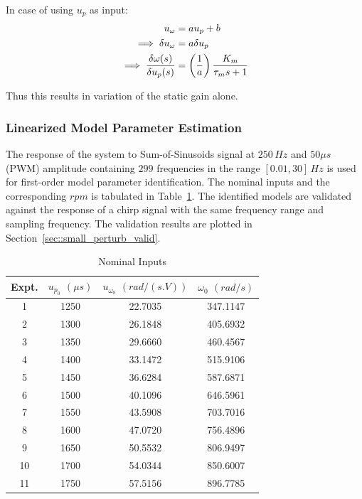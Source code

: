 In case of using $u_p$ as input:
\begin{align*}
    u_\omega &= a u_p + b\\
    \implies \delta u_\omega &= a \delta u_p\\
    \implies \frac{\delta \omega(s)}{\delta u_p(s)} &= \left( \frac{1}{a} \right)\frac{K_m}{\tau_m s + 1}
\end{align*}

Thus this results in variation of the static gain alone.


\subsubsection{Linearized Model Parameter Estimation}
The response of the system to Sum-of-Sinusoids signal at $250 \, Hz$ and $50 \mu s$ (PWM) amplitude containing $299$ frequencies in the range $[0.01, 30]\,Hz$ is used for first-order model parameter identification. The nominal inputs and the corresponding $rpm$ is tabulated in Table~\ref{tab::nom_in}. The identified models are validated against the response of a chirp signal with the same frequency range and sampling frequency. The validation results are plotted in Section~\ref{sec::small_perturb_valid}.

\begin{table}[H]
    \centering
    \begin{tabular}{c c c c}
        \hline \hline
        Expt. & $u_{p_0}$ $(\mu s)$& $u_{\omega_0}$ $(rad/(s.V))$ & $\omega_0$ $(rad/s)$ \\ \hline \hline
            1 & 1250      &  22.7035       &  347.1147   \\
            2 & 1300      &  26.1848       &  405.6932   \\
            3 & 1350      &  29.6660       &  460.4567   \\
            4 & 1400      &  33.1472       &  515.9106   \\
            5 & 1450      &  36.6284       &  587.6871   \\
            6 & 1500      &  40.1096       &  646.5961   \\
            7 & 1550      &  43.5908       &  703.7016   \\
            8 & 1600      &  47.0720       &  756.4896   \\
            9 & 1650      &  50.5532       &  806.9497   \\
           10 & 1700      &  54.0344       &  850.6007   \\
           11 & 1750      &  57.5156       &  896.7785   \\
           \hline \hline
    \end{tabular}
    \caption{Nominal Inputs}
    \label{tab::nom_in}
\end{table}


